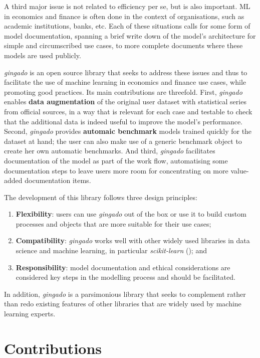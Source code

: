 \documentclass{article}
\begin{document}
A third major issue is not related to efficiency per se, but is also important. ML in economics and finance is often done in the context of organisations, such as academic institutions, banks, etc. Each of these situations calls for some form of model documentation, spanning a brief write down of the model's architecture for simple and circumscribed use cases, to more complete documents where these models are used publicly.

\textit{gingado} is an open source library that seeks to address these issues and thus to facilitate the use of machine learning in economics and finance use cases, while promoting good practices. Its main contributions are threefold. First, \textit{gingado} enables \textbf{data augmentation} of the original user dataset with statistical series from official sources, in a way that is relevant for each case and testable to check that the additional data is indeed useful to improve the model's performance. Second, \textit{gingado} provides \textbf{automaic benchmark} models trained quickly for the dataset at hand; the user can also make use of a generic benchmark object to create her own automatic benchmarks. And third, \textit{gingado} facilitates documentation of the model as part of the work flow, automatising some documentation steps to leave users more room for concentrating on more value-added documentation items. 

The development of this library follows three design principles:
\begin{enumerate}
    \item \textbf{Flexibility}: users can use \textit{gingado} out of the box or use it to build custom processes and objects that are more suitable for their use cases;
    \item \textbf{Compatibility}: \textit{gingado} works well with other widely used libraries in data science and machine learning, in particular \textit{scikit-learn} (\cite{scikit-learn}); and
    \item \textbf{Responsibility}: model documentation and ethical considerations are considered key steps in the modelling process and should be facilitated.
\end{enumerate}
In addition, \textit{gingado} is a parsimonious library that seeks to complement rather than redo existing features of other libraries that are widely used by machine learning experts. 

\section{Contributions}
\end{document}
